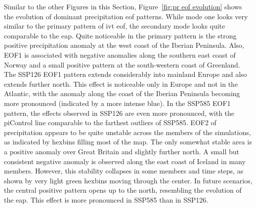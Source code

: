 Similar to the other Figures in this Section, Figure~\ref{fig:pr eof evolution} shows the evolution of dominant precipitation \ac{eof} patterns. 
While mode one looks very similar to the primary pattern of \ac{ivt} \ac{eof}, the secondary mode looks quite comparable to the \ac{eap}. 
Quite noticeable in the primary pattern is the strong positive precipitation anomaly at the west coast of the Iberian Peninsula. 
Also, EOF1 is associated with negative anomalies along the southern east coast of Norway and a small positive pattern at the south-western coast of Greenland. 
The SSP126 EOF1 pattern extends considerably into mainland Europe and also extends further north. 
This effect is noticeable only in Europe and not in the Atlantic, with the anomaly along the coast of the Iberian Peninsula becoming more pronounced (indicated by a more intense blue). 
In the SSP585 EOF1 pattern, the effects observed in SSP126 are even more pronounced, with the piControl line comparable to the farthest outliers of SSP585.
EOF2 of precipitation appears to be quite unstable across the members of the simulations, as indicated by hexbins filling most of the map. The only somewhat stable area is a positive anomaly over Great Britain and slightly further north. A small but consistent negative anomaly is observed along the east coast of Iceland in many members. However, this stability collapses in some members and time steps, as shown by very light green hexbins moving through the center. In future scenarios, the central positive pattern opens up to the north, resembling the evolution of the \ac{eap}. This effect is more pronounced in SSP585 than in SSP126.



